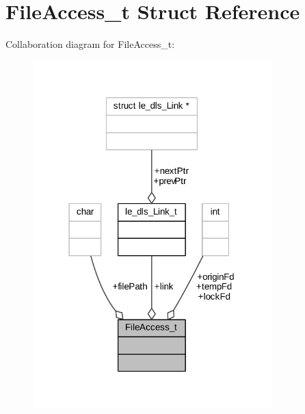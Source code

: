 \hypertarget{struct_file_access__t}{}\section{File\+Access\+\_\+t Struct Reference}
\label{struct_file_access__t}


Collaboration diagram for File\+Access\+\_\+t\+:
\nopagebreak
\begin{figure}[H]
\begin{center}
\leavevmode
\includegraphics[width=262pt]{struct_file_access__t__coll__graph}
\end{center}
\end{figure}
